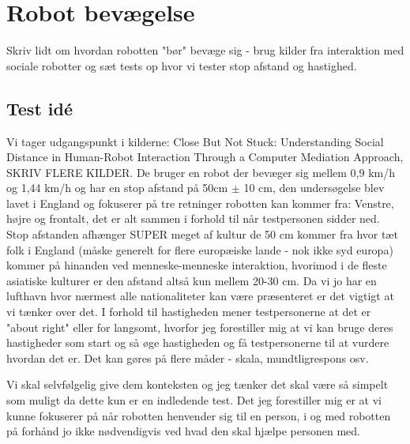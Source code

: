 \chapter{Robot bevægelse}
\label{RobotBevaegelse}
%
Skriv lidt om hvordan robotten "bør" bevæge sig - brug kilder fra interaktion med sociale robotter og sæt tests op hvor vi tester stop afstand og hastighed. \blankline
%
\section{Test idé}
%
Vi tager udgangspunkt i kilderne: Close But Not Stuck:
Understanding Social Distance in Human-Robot Interaction Through a Computer Mediation Approach, SKRIV FLERE KILDER. De bruger en robot der bevæger sig mellem 0,9 km/h og 1,44 km/h og har en stop afstand på 50cm $\pm$ 10 cm, den undersøgelse blev lavet i England og fokuserer på tre retninger robotten kan kommer fra: Venstre, højre og frontalt, det er alt sammen i forhold til når testpersonen sidder ned. Stop afstanden afhænger SUPER meget af kultur de 50 cm kommer fra hvor tæt folk i England (måske generelt for flere europæiske lande - nok ikke syd europa) kommer på hinanden ved menneske-menneske interaktion, hvorimod i de fleste asiatiske kulturer er den afstand altså kun mellem 20-30 cm. Da vi jo har en lufthavn hvor nærmest alle nationaliteter kan være præsenteret er det vigtigt at vi tænker over det. I forhold til hastigheden mener testpersonerne at det er "about right" eller for langsomt, hvorfor jeg forestiller mig at vi kan bruge deres hastigheder som start og så øge hastigheden og få testpersonerne til at vurdere hvordan det er. Det kan gøres på flere måder - skala, mundtligrespons osv. 

Vi skal selvfølgelig give dem konteksten og jeg tænker det skal være så simpelt som muligt da dette kun er en indledende test. Det jeg forestiller mig er at vi kunne fokuserer på når robotten henvender sig til en person, i og med robotten på forhånd jo ikke nødvendigvis ved hvad den skal hjælpe personen med. 

